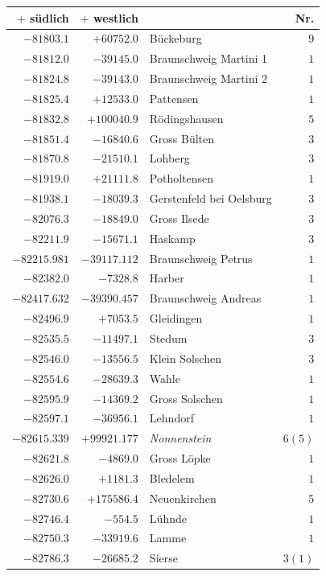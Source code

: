 \clearpage{}%
\begin{center}\begingroup\fontsize{8}{9}\selectfont
\setlength{\tabcolsep}{4pt}
\begin{tabular}{r|r|p{170pt}|r}\hline
\(+\) südlich&\(+\) westlich&&Nr.\\\hline
\(-81803.1\)&\(+60752.0\)&Bückeburg&\(9\)\\
\(-81812.0\)&\(-39145.0\)&Braunschweig Martini 1&\(1\)\\
\(-81824.8\)&\(-39143.0\)&Braunschweig Martini 2&\(1\)\\
\(-81825.4\)&\(+12533.0\)&Pattensen&\(1\)\\
\(-81832.8\)&\(+100040.9\)&Rödingshausen&\(5\)\\
\(-81851.4\)&\(-16840.6\)&Gross Bülten&\(3\)\\
\(-81870.8\)&\(-21510.1\)&Lohberg&\(3\)\\
\(-81919.0\)&\(+21111.8\)&Potholtensen&\(1\)\\
\(-81938.1\)&\(-18039.3\)&Gerstenfeld bei Oelsburg&\(3\)\\
\(-82076.3\)&\(-18849.0\)&Gross Ilsede&\(3\)\\
\(-82211.9\)&\(-15671.1\)&Haskamp&\(3\)\\
\(-82215.981\)&\(-39117.112\)&Braunschweig Petrus&\(1\)\\
\(-82382.0\)&\(-7328.8\)&Harber&\(1\)\\
\(-82417.632\)&\(-39390.457\)&Braunschweig Andreas&\(1\)\\
\(-82496.9\)&\(+7053.5\)&Gleidingen&\(1\)\\
\(-82535.5\)&\(-11497.1\)&Stedum&\(3\)\\
\(-82546.0\)&\(-13556.5\)&Klein Solschen&\(3\)\\
\(-82554.6\)&\(-28639.3\)&Wahle&\(1\)\\
\(-82595.9\)&\(-14369.2\)&Gross Solschen&\(1\)\\
\(-82597.1\)&\(-36956.1\)&Lehndorf&\(1\)\\
\(-82615.339\)&\(+99921.177\)&\textit{Nonnenstein}&\(6 (5)\)\\
\(-82621.8\)&\(-4869.0\)&Gross Löpke&\(1\)\\
\(-82626.0\)&\(+1181.3\)&Bledelem&\(1\)\\
\(-82730.6\)&\(+175586.4\)&Neuenkirchen&\(5\)\\
\(-82746.4\)&\(-554.5\)&Lühnde&\(1\)\\
\(-82750.3\)&\(-33919.6\)&Lamme&\(1\)\\
\(-82786.3\)&\(-26685.2\)&Sierse&\(3 (1)\)\\

\end{tabular}
\end{center}
